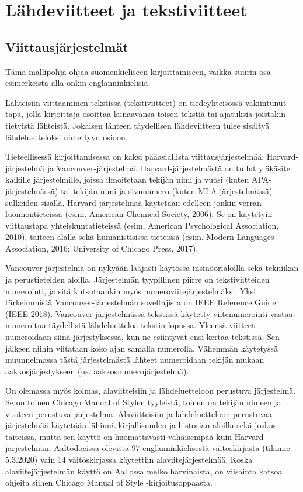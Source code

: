 \documentclass[finnish, 12pt, a4paper, arts, utf8, a-2b, online]{aaltothesis}
\begin{document}
\clearpage
\section{Lähdeviitteet ja tekstiviitteet}
\label{liite:viitteet}
\subsection*{Viittausjärjestelmät}

Tämä mallipohja ohjaa suomenkieliseen kirjoittamiseen, vaikka suurin osa 
esimerkeistä alla onkin englanninkielisiä.

Lähteisiin viittaaminen tekstissä (tekstiviitteet) on tiedeyhteisössä 
vakiintunut tapa, jolla kirjoittaja osoittaa lainaavansa toisen tekstiä tai 
ajatuksia joistakin tietyistä lähteistä. Jokaisen lähteen täydellisen 
lähdeviitteen tulee sisältyä lähdeluetteloksi nimettyyn osioon.

Tieteellisessä kirjoittamisessa on kaksi pääasiallista viittausjärjestelmää: 
Harvard-järjestelmä ja Vancouver-järjestelmä. Harvard-järjestelmästä on tullut 
yläkäsite kaikille järjestelmille, joissa ilmoitetaan tekijän nimi ja vuosi 
(kuten APA-järjestelmässä) tai tekijän nimi ja sivunumero (kuten 
MLA-järjestelmässä) sulkeiden sisällä. Harvard-järjestelmää käytetään edelleen 
jonkin verran luonnontieteissä (esim. American Chemical Society, 2006). Se on 
käytetyin viittaustapa yhteiskuntatieteissä (esim. American Psychological 
Association, 2010), taiteen alalla sekä humanistisissa tieteissä (esim. Modern 
Languages Association, 2016; University of Chicago Press, 2017).

Vancouver-järjestelmä on nykyään laajasti käytössä insinöörialoilla sekä 
tekniikan ja perustieteiden aloilla. Järjestelmän tyypillinen piirre on 
tekstiviitteiden numerointi, ja sitä kutsutaankin myös 
numeroviitejärjestelmäksi. Yksi tärkeimmistä Vancouver-järjestelmän soveltajista
on IEEE Reference Guide (IEEE 2018). Vancouver-järjestelmässä tekstissä käytetty 
viitenumerointi vastaa numeroitua täydellistä lähdeluetteloa tekstin lopussa. 
Yleensä viitteet numeroidaan siinä järjestyksessä, kun ne esiintyvät ensi kertaa 
tekstissä. Sen jälkeen niihin viitataan koko ajan samalla numerolla. Vähemmän 
käytetyssä muunnelmassa tästä järjestelmästä lähteet numeroidaan tekijän mukaan 
aakkosjärjestykseen (ns. aakkosnumerojärjestelmä).

On olemassa myös kolmas, alaviitteisiin ja lähdeluetteloon perustuva 
järjestelmä. Se on toinen Chicago Manual of Stylen tyyleistä; toinen on tekijän 
nimeen ja vuoteen perustuva järjestelmä. Alaviitteisiin ja lähdeluetteloon 
perustuvaa järjestelmää käytetään lähinnä kirjallisuuden ja historian aloilla 
sekä joskus taiteissa, mutta sen käyttö on huomattavasti vähäisempää kuin 
Harvard-järjestelmän. Aaltodocissa olevista 97 englanninkielisestä 
väitöskirjasta (tilanne 5.3.2020) vain 14 väitöskirjassa käytettiin 
alaviitejärjestelmää. Koska alaviitejärjestelmän käyttö on Aallossa melko 
harvinaista, on viisainta katsoa ohjeita siihen Chicago Manual of Style 
-kirjoitusoppaasta.
\end{document}
